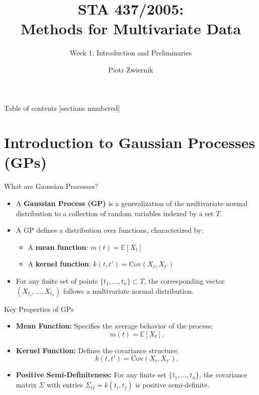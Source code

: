 \documentclass[11pt,handout,aspectratio=169]{beamer}
\title[STA437-Week1]{STA 437/2005: \\ Methods for Multivariate Data}
\subtitle[]{Week 1: Introduction and Preliminaries}
\author[Prob Learning]{Piotr Zwiernik}
\institute[UofT]{University of Toronto}
\date{}
\begin{document}
\maketitle

\begin{frame}{Table of contents}
  [sections numbered]
  \tableofcontents%
\end{frame}



\section{Introduction to Gaussian Processes (GPs)}

\begin{frame}{What are Gaussian Processes?}
\begin{itemize}
    \item A \textbf{Gaussian Process (GP)} is a generalization of the multivariate normal distribution to a collection of random variables indexed by a set \( T \).
    \item A GP defines a distribution over functions, characterized by:
    \begin{itemize}
        \item A \textbf{mean function}: \( m(t) = \mathbb{E}[X_t] \)
        \item A \textbf{kernel function}: \( k(t, t') = \text{Cov}(X_t, X_{t'}) \)
    \end{itemize}
    \item For any finite set of points \( \{t_1, \dots, t_n\} \subset T \), the corresponding vector \( (X_{t_1}, \dots, X_{t_n}) \) follows a multivariate normal distribution.
\end{itemize}
\end{frame}


\begin{frame}{Key Properties of GPs}
\begin{itemize}
    \item \textbf{Mean Function:} Specifies the average behavior of the process:
    \[
    m(t) = \mathbb{E}[X_t].
    \]
    \item \textbf{Kernel Function:} Defines the covariance structure:
    \[
    k(t, t') = \text{Cov}(X_t, X_{t'}).
    \]
    \item \textbf{Positive Semi-Definiteness:} For any finite set \( \{t_1, \dots, t_n\} \), the covariance matrix \( \Sigma \) with entries \( \Sigma_{ij} = k(t_i, t_j) \) is positive semi-definite.
\end{itemize}
\end{frame}
\end{document}
